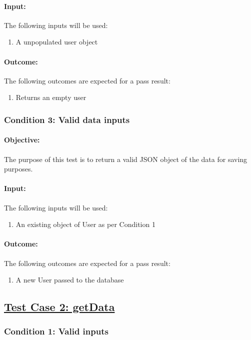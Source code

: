 \documentclass{article}
\begin{document}
\paragraph{Input:} The following inputs will be used:
\begin{enumerate}
	\item A unpopulated user object
\end{enumerate}
\paragraph{Outcome:} The following outcomes are expected for a pass result:
\begin{enumerate}
	\item Returns an empty user
\end{enumerate}
\subsubsection{Condition 3: Valid data inputs}
\paragraph{Objective:} The purpose of this test is to return a valid JSON object of the data for saving purposes.
\paragraph{Input:} The following inputs will be used:
\begin{enumerate}
	\item An existing object of User as per Condition 1
\end{enumerate}
\paragraph{Outcome:} The following outcomes are expected for a pass result:
\begin{enumerate}
	\item A new User passed to the database
\end{enumerate}

\subsection{\underline{Test Case 2: getData}}\label{test2}
\subsubsection{Condition 1: Valid inputs }
\end{document}
